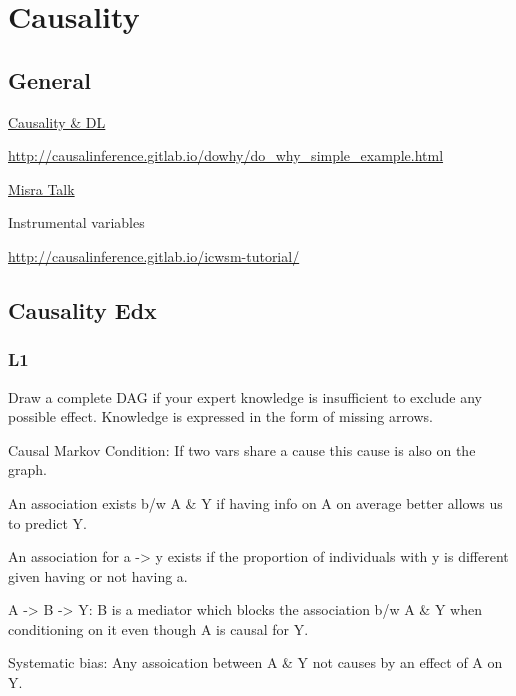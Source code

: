 \documentclass[]{book}
\begin{document}
\chapter{Causality}\label{causality}

\section{General}\label{general-9}

\href{https://twitter.com/tdietterich/status/1034631407904018437}{Causality
\& DL}

\url{http://causalinference.gitlab.io/dowhy/do_why_simple_example.html}

\href{https://pages.dataiku.com/hubfs/PDF/Meetup-Presentation/06-18_Stress-Testing_Mishra.pdf?t=1532033314245\&utm_campaign=US\%20Event\%20Meetup\%20NYU\%20NYC\%20July\%202018\&utm_source=hs_email\&utm_medium=email\&utm_content=64589348\&_hsenc=p2ANqtz-9_41UxxLKzauP5Gf5bbRh63DzcsGFL8hMuW8HH8a_a1AeS9zaESqO-PoTbCkzXirAvWBJnHgvb-PEi_l7ds9IWg_y25H7xE2uVhBib3XwWmO68PBI\&_hsmi=64589348}{Misra
Talk}

Instrumental variables

\url{http://causalinference.gitlab.io/icwsm-tutorial/}

\section{Causality Edx}\label{causality-edx}

\subsection{L1}\label{l1}

Draw a complete DAG if your expert knowledge is insufficient to exclude
any possible effect. Knowledge is expressed in the form of missing
arrows.

Causal Markov Condition: If two vars share a cause this cause is also on
the graph.

An association exists b/w A \& Y if having info on A on average better
allows us to predict Y.

An association for a -\textgreater{} y exists if the proportion of
individuals with y is different given having or not having a.

A -\textgreater{} B -\textgreater{} Y: B is a mediator which blocks the
association b/w A \& Y when conditioning on it even though A is causal
for Y.

Systematic bias: Any assoication between A \& Y not causes by an effect
of A on Y.
\end{document}
